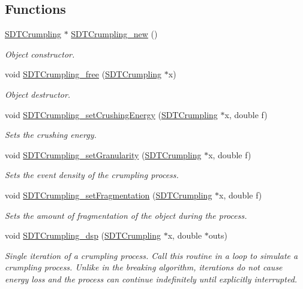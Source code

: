 \subsection*{Functions}
\begin{DoxyCompactItemize}
\item 
\hyperlink{group__crumpling_ga1d5c6cf3fe003cd4d993dcfe0a39f72e}{S\+D\+T\+Crumpling} $\ast$ \hyperlink{group__crumpling_ga5c4f19df719468828791ac6ee92fd3ee}{S\+D\+T\+Crumpling\+\_\+new} ()
\begin{DoxyCompactList}\small\item\em Object constructor. \end{DoxyCompactList}\item 
void \hyperlink{group__crumpling_ga5dbe175da229d809f2e92482a72ea1bb}{S\+D\+T\+Crumpling\+\_\+free} (\hyperlink{group__crumpling_ga1d5c6cf3fe003cd4d993dcfe0a39f72e}{S\+D\+T\+Crumpling} $\ast$x)
\begin{DoxyCompactList}\small\item\em Object destructor. \end{DoxyCompactList}\item 
void \hyperlink{group__crumpling_ga41986a18797f97a5f27554a702979c08}{S\+D\+T\+Crumpling\+\_\+set\+Crushing\+Energy} (\hyperlink{group__crumpling_ga1d5c6cf3fe003cd4d993dcfe0a39f72e}{S\+D\+T\+Crumpling} $\ast$x, double f)
\begin{DoxyCompactList}\small\item\em Sets the crushing energy. \end{DoxyCompactList}\item 
void \hyperlink{group__crumpling_ga813d36c8f3c981a70c2f2e24059da618}{S\+D\+T\+Crumpling\+\_\+set\+Granularity} (\hyperlink{group__crumpling_ga1d5c6cf3fe003cd4d993dcfe0a39f72e}{S\+D\+T\+Crumpling} $\ast$x, double f)
\begin{DoxyCompactList}\small\item\em Sets the event density of the crumpling process. \end{DoxyCompactList}\item 
void \hyperlink{group__crumpling_ga1be320d8744d98d47de5f9e0150d55a2}{S\+D\+T\+Crumpling\+\_\+set\+Fragmentation} (\hyperlink{group__crumpling_ga1d5c6cf3fe003cd4d993dcfe0a39f72e}{S\+D\+T\+Crumpling} $\ast$x, double f)
\begin{DoxyCompactList}\small\item\em Sets the amount of fragmentation of the object during the process. \end{DoxyCompactList}\item 
void \hyperlink{group__crumpling_gaafe4f3122ded1b386260c9f67839e453}{S\+D\+T\+Crumpling\+\_\+dsp} (\hyperlink{group__crumpling_ga1d5c6cf3fe003cd4d993dcfe0a39f72e}{S\+D\+T\+Crumpling} $\ast$x, double $\ast$outs)
\begin{DoxyCompactList}\small\item\em Single iteration of a crumpling process. Call this routine in a loop to simulate a crumpling process. Unlike in the breaking algorithm, iterations do not cause energy loss and the process can continue indefinitely until explicitly interrupted. \end{DoxyCompactList}\end{DoxyCompactItemize}


